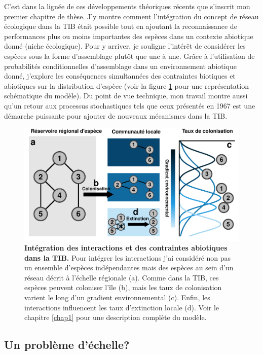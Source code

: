 C'est dans la lignée de ces développements théoriques récents que
s'inscrit mon premier chapitre de thèse. J'y montre comment
l'intégration du concept de réseau écologique dans la TIB était possible
tout en ajoutant la reconnaissance de performances plus ou moins
importantes des espèces dans un contexte abiotique donné (niche
écologique). Pour y arriver, je souligne l'intérêt de considérer les
espèces sous la forme d'assemblage plutôt que une à une. Grâce à
l'utilisation de probabilités conditionnelles d'assemblage dans un
environnement abiotique donné, j'explore les conséquences simultannées
des contraintes biotiques et abiotiques sur la distribution d'espèce
(voir la figure \ref{fig:figGTIB} pour une représentation schématique du
modèle). Du point de vue technique, mon travail montre aussi qu'un
retour aux processus stochastiques tels que ceux présentés en 1967 est
une démarche puissante pour ajouter de nouveaux mécanismes dans la TIB.

\begin{figure}[htbp]
\centering
\includegraphics{fig/fig2.pdf}
\caption[Intégration des interactions et des contraintes
abiotiques dans la TIB]{\textbf{Intégration des interactions et des contraintes
abiotiques dans la TIB.} Pour intégrer les interactions j'ai considéré
non pas un ensemble d'espèces indépendantes mais des espèces au sein
d'un réseau décrit à l'échelle régionale (a). Comme dans la TIB, ces
espèces peuvent coloniser l'île (b), mais les taux de colonisation
varient le long d'un gradient environnemental (c). Enfin, les
interactions influencent les taux d'extinction locale (d). Voir le
chapitre \ref{chap1} pour une description complète du
modèle.\label{fig:figGTIB}}
\end{figure}

\subsection*{Un problème d'échelle?}\label{un-probluxe8me-duxe9chelle}

